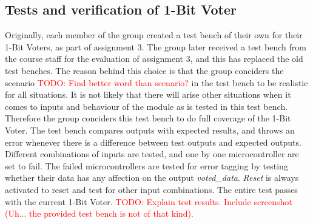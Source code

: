 \documentclass[a4paper]{IEEEtran}
\newcommand\TODO[1]{\textcolor{red}{TODO:#1}}
\newcommand\todo[1]{\TODO{#1}}
\begin{document}
\subsection{ Tests and verification of 1-Bit Voter}
Originally, each member of the group created a test bench of their own for their 1-Bit Voters, as part of assignment 3.
The group later received a test bench from the course staff for the evaluation of assignment 3, and this has replaced the old test benches.
The reason behind this choice is that the group conciders the scenario \todo{ Find better word than scenario?} in the test bench to be realistic for all situations.
It is not likely that there will arise other situations when it comes to inputs and behaviour of the module as is tested in this test bench.
Therefore the group conciders this test bench to do full coverage of the 1-Bit Voter.
The test bench compares outputs with expected results, and throws an error whenever there is a difference between test outputs and expected outputs.
Different combinations of inputs are tested, and one by one microcontroller are set to fail.
The failed microcontrollers are tested for error tagging by testing whether their data has any affection on the output \textit{voted\_data}.
\textit{Reset} is always activated to reset and test for other input combinations.
The entire test passes with the current 1-Bit Voter. 
\todo{ Explain test results. Include screenshot (Uh... the provided test bench is not of that kind).}
\end{document}
